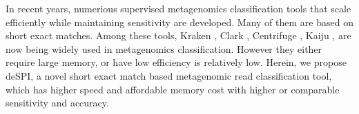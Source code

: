 \documentclass[a0,portrait]{a0poster}
\begin{document}
\begin{multicols}{2}
In recent years, numerious supervised metagenomics classification tools that scale efficiently while maintaining sensitivity are developed. Many of them are based on short exact matches. Among these tools, Kraken \cite{Wood2014-es}, Clark \cite{Ounit2015-fi}, Centrifuge \cite{Kim2016-zf}, Kaiju \cite{Menzel2016-mi}, are now being widely used in metagenomics classification. However they either require large memory,  or have low efficiency is relatively low. Herein, we propose deSPI, a novel short exact match based metagenomic read classification tool, which has higher speed and affordable memory cost with higher or comparable sensitivity and accuracy. 


\color{DarkSlateGray} %

%



\end{multicols}
\end{document}
